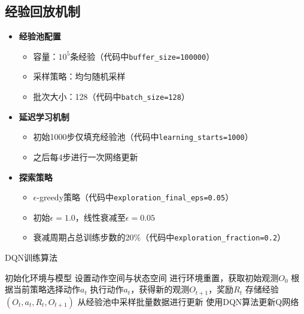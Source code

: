 \subsection{经验回放机制}
\begin{itemize}
    \item \textbf{经验池配置}
    \begin{itemize}
        \item 容量：$10^5$条经验（代码中\texttt{buffer\_size=100000}）
        \item 采样策略：均匀随机采样
        \item 批次大小：128（代码中\texttt{batch\_size=128}）
    \end{itemize}
    
    \item \textbf{延迟学习机制}
    \begin{itemize}
        \item 初始1000步仅填充经验池（代码中\texttt{learning\_starts=1000}）
        \item 之后每4步进行一次网络更新
    \end{itemize}
    
    \item \textbf{探索策略}
    \begin{itemize}
        \item $\epsilon$-greedy策略（代码中\texttt{exploration\_final\_eps=0.05}）
        \item 初始$\epsilon=1.0$，线性衰减至$\epsilon=0.05$
        \item 衰减周期占总训练步数的20\%（代码中\texttt{exploration\_fraction=0.2}）
    \end{itemize}
\end{itemize}

\begin{algorithm}[H]
    \caption{DQN训练算法}
    \begin{algorithmic}[1]
    \STATE 初始化环境与模型
    \STATE 设置动作空间与状态空间
        \STATE 进行环境重置，获取初始观测$O_0$
            \STATE 根据当前策略选择动作$a_t$
            \STATE 执行动作$a_t$，获得新的观测$O_{t+1}$，奖励$R_t$
            \STATE 存储经验$(O_t, a_t, R_t, O_{t+1})$
            \STATE 从经验池中采样批量数据进行更新
            \STATE 使用DQN算法更新Q网络
        \ENDFOR
    \ENDWHILE
    \end{algorithmic}
\end{algorithm}

